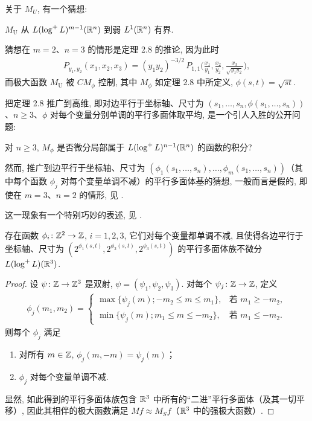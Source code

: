 关于 $M_{U}$, 有一个猜想:

$M_{\mathrm{U}}$ 从 $L(\log^{+}L)^{m-1}(\mathbb{R}^{n})$ 到弱 $L^{1}(\mathbb{R}^{n})$ 有界.

猜想在 $m = 2$、$n = 3$ 的情形是定理 2.8 的推论, 因为此时
\begin{align*}
  P_{y_{1},y_{2}}(x_{1},x_{2},x_{3})
  =(y_{1}y_{2})^{-3/2}\,P_{1,1}\Big(\frac{x_{1}}{y_{1}},\frac{x_{2}}{y_{2}},\frac{x_{3}}{\sqrt{y_{1}y_{2}}}\Big),
\end{align*}
而极大函数 $M_{\mathrm{U}}$ 被 $CM_{\phi}$ 控制, 其中 $M_{\phi}$ 如定理 2.8 中所定义, $\phi(s,t) = \sqrt{st}$.

把定理 2.8 推广到高维, 即对边平行于坐标轴、尺寸为 $(s_1, \ldots, s_n, \phi(s_1, \ldots, s_n))$、$n \geq 3$、$\phi$ 对每个变量分别单调的平行多面体取平均, 是一个引人入胜的公开问题:

对 $n \geq 3$, $M_{\phi}$ 是否微分局部属于 $L(\log^{+}L)^{n-1}(\mathbb{R}^{n})$ 的函数的积分?

然而, 推广到边平行于坐标轴、尺寸为 $(\phi_1(s_1, \ldots, s_n), \ldots, \phi_m(s_1, \ldots, s_n))$（其中每个函数 $\phi_j$ 对每个变量单调不减）的平行多面体基的猜想, 一般而言是假的, 即使在 $m = 3$、$n = 2$ 的情形, 见 \cite{b52}.

这一现象有一个特别巧妙的表述, 见 \cite{b51}.

\begin{theorem}\label{thm:2.11}
存在函数 $\phi_i\colon \mathbb{Z}^2 \to \mathbb{Z}$, $i = 1, 2, 3$, 它们对每个变量都单调不减, 且使得各边平行于坐标轴、尺寸为 $(2^{\phi_1(s,t)}, 2^{\phi_2(s,t)}, 2^{\phi_3(s,t)})$ 的平行多面体族不微分 $L(\log^{+}L)(\mathbb{R}^3)$.
\end{theorem}

\begin{proof}
设 $\psi\colon \mathbb{Z} \to \mathbb{Z}^3$ 是双射, $\psi = (\psi_1, \psi_2, \psi_3)$. 对每个 $\psi_j\colon \mathbb{Z} \to \mathbb{Z}$, 定义
\begin{align*}
  \phi_{j}(m_{1},m_{2})=
  \begin{cases}
    \max\{\psi_{j}(m); -m_{2}\leq m\leq m_{1}\}, & \text{若 } m_{1}\geq -m_{2},\\
    \min\{\psi_{j}(m); m_{1}\leq m\leq -m_{2}\}, & \text{若 } m_{1}\leq -m_{2}.
  \end{cases}
\end{align*}
则每个 $\phi_{j}$ 满足
\begin{enumerate}
\item[(i)] 对所有 $m \in \mathbb{Z}$, $\phi_j(m, -m) = \psi_j(m)$；
\item[(ii)] $\phi_{j}$ 对每个变量单调不减.
\end{enumerate}
显然, 如此得到的平行多面体族包含 $\mathbb{R}^3$ 中所有的``二进''平行多面体（及其一切平移）, 因此其相伴的极大函数满足 $M f \approx M_S f$（$\mathbb{R}^3$ 中的强极大函数）.
\end{proof}

